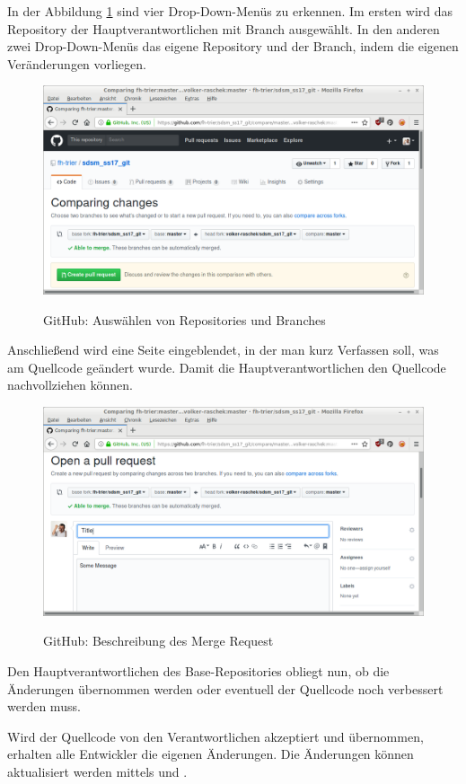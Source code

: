In der Abbildung \ref{img:github-pull-request-select-branches} sind vier Drop-Down-Menüs zu erkennen. Im ersten wird das Repository der Hauptverantwortlichen mit Branch ausgewählt. In den anderen zwei Drop-Down-Menüs das eigene Repository und der Branch, indem die eigenen Veränderungen vorliegen.

\begin{figure}[H]
  \centering
  \includegraphics[width=1\textwidth]{images//pull-request2.png}
  \label{img:github-pull-request-select-branches}
  \caption{GitHub: Auswählen von Repositories und Branches}
\end{figure}

Anschließend wird eine Seite eingeblendet, in der man kurz Verfassen soll, was am Quellcode geändert wurde. Damit die Hauptverantwortlichen den Quellcode nachvollziehen können.

\begin{figure}[H]
  \centering
  \includegraphics[width=1\textwidth]{images//pull-request3.png}
  \label{img:github-pull-request-description}
  \caption{GitHub: Beschreibung des Merge Request}
\end{figure}

Den Hauptverantwortlichen des Base-Repositories obliegt nun, ob die Änderungen übernommen werden oder eventuell der Quellcode noch verbessert werden muss. 

Wird der Quellcode von den Verantwortlichen akzeptiert und übernommen, erhalten alle Entwickler die eigenen Änderungen. Die Änderungen können aktualisiert werden mittels \textit{} und \textit{}.
